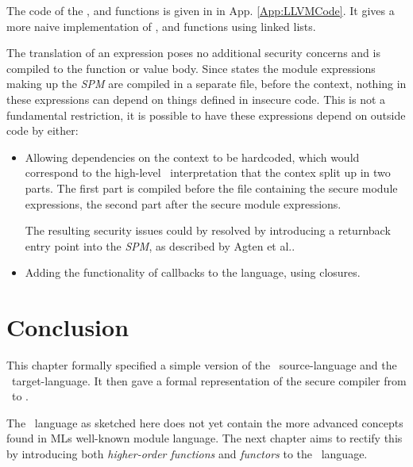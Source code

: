 The code of the ,  and  functions is given in  in App. \ref{App:LLVMCode}. 
It gives a more naive implementation of ,  and  functions using linked lists.

The translation of an expression poses no additional security concerns and is compiled to the function or value body.
Since  states the module expressions making up the \emph{SPM} are compiled in a separate file, before the context, nothing in these expressions can depend on things defined in insecure code.
This is not a fundamental restriction, it is possible to have these expressions depend on outside code by either:
\begin{itemize}
\item Allowing dependencies on the context to be hardcoded, which would correspond to the high-level \MiniML\ interpretation that the contex split up in two parts.
The first part is compiled before the file containing the secure module expressions, the second part after the secure module expressions.

The resulting security issues could by resolved by introducing a returnback entry point into the \emph{SPM}, as described by Agten et al.\cite{Agten:2012:SCM:2354412.2355247}.
\item Adding the functionality of callbacks to the language, using closures.
\end{itemize}

\section{Conclusion}
This chapter formally specified a simple version of the \MiniML\ source-language and the \LLVMIR\ target-language.
It then gave a formal representation of the secure compiler from \MiniML\ to \LLVMIR.

The \MiniML\ language as sketched here does not yet contain the more advanced concepts found in MLs well-known module language.
The next chapter aims to rectify this by introducing both \emph{higher-order functions} and \emph{functors} to the \MiniML\ language.



